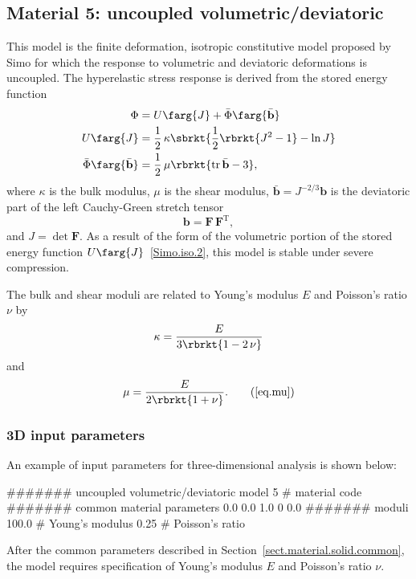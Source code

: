 \subsection{Material 5: uncoupled volumetric/deviatoric}
\label{sect.mat.SimoIso}
This model is the finite deformation, isotropic
constitutive model proposed by 
Simo \etal\cite{Simo1985} for
which the response to volumetric and deviatoric
deformations is uncoupled.
The hyperelastic stress response is derived from the
stored energy function
\begin{align}
\Phi &= U\farg{J} + \bar{\Phi}\farg{\bar{\mathbf{b}}} 
\label{Simo.iso.1}\\
U\farg{J} &= \frac{1}{2}\,\kappa 
    \sbrkt{
        \frac{1}{2} \rbrkt{J^{2}-1}-\ln J 
    } \label{Simo.iso.2}\\
\bar{\Phi}\farg{\bar{\mathbf{b}}} &=
    \frac{1}{2}\,\mu \rbrkt{\text{tr}\,\bar{\mathbf{b}} - 
    3}\label{Simo.iso.3},
\end{align}
where $\kappa$ is the bulk modulus, $\mu$ is the shear modulus,
$\bar{\mathbf{b}}=J^{-2/3}\mathbf{b}$ is the deviatoric part of the
left Cauchy-Green stretch tensor
\begin{equation}
	\mathbf{b} = \mathbf{F}\,\mathbf{F}^{\text{T}},
\end {equation}
and $J = \det \mathbf{F}$. As a result of the form of 
the volumetric portion 
of the stored energy function
$U\farg{J}$~\eqref{Simo.iso.2}, this model is 
stable under severe compression.

The bulk and shear moduli are related to Young's modulus $E$
and Poisson's ratio $\nu$ by
\begin{equation}
\label{eq.kappa}
\kappa = \frac{E}{3 \rbrkt{1 - 2\,\nu}}
\end{equation}
and
\begin{equation}
\mu = \frac{E}{2 \rbrkt{1 + \nu}}.
\tag{\ref{eq.mu}}
\end{equation}

\subsubsection{3D input parameters}
An example of input parameters for three-dimensional analysis is shown 
below:
\begin{inputfile}
####### uncoupled volumetric/deviatoric model
5     # material code
####### common material parameters
0.0    0.0    1.0
0      0.0
####### moduli
100.0 # Young's modulus
0.25  # Poisson's ratio
\end{inputfile}
After the common parameters described in 
Section~\ref{sect.material.solid.common}, the 
model requires specification of Young's modulus 
$E$ and Poisson's ratio $\nu$.

